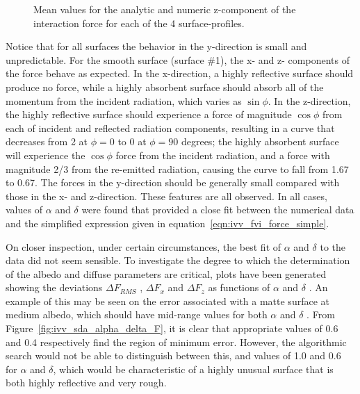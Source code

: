 \begin{description}
\begin{figure}[!ht]
        \caption{Mean values for the analytic and numeric z-component of
                the interaction force for each of the 4
                surface-profiles.}
        \label{fig:ivv_sda_f_vector_diffs_z}
      \end{figure}

      Notice that for all surfaces the behavior in the y-direction
      is small and unpredictable.
      For the smooth surface (surface \#1),
      the x{}- and z{}- components of the force behave
      as expected. In the x{}-direction, a highly reflective surface should
      produce no force, while a highly absorbent surface should absorb all of
      the momentum from the incident radiation, which varies as $\sin \phi$.
      In the z{}-direction, the highly reflective surface should
      experience a force of magnitude  $\cos \phi $ from each of incident and
      reflected radiation components, resulting in a curve that decreases from
      2 at
      $\phi =0$ to 0 at  $\phi =90$ degrees; the highly absorbent surface will
      experience the  $\cos \phi $ force from the incident radiation, and a
      force with magnitude 2/3 from the re{}-emitted radiation, causing the
      curve to fall from 1.67 to 0.67. The forces in the y{}-direction
      should be generally small compared with those in the x{}- and
      z{}-direction. These features are all observed. In all cases,
      values of $\alpha $ and  $\delta $ were found that provided a close fit
      between the numerical data and the simplified expression given in
      equation~\ref{eqn:ivv_fvi_force_simple}.

      \clearpage

      On closer inspection, under certain circumstances, the best fit of
      $\alpha $ and  $\delta $ to the data did not seem sensible. To
      investigate the degree to which the determination of the albedo and
      diffuse parameters are critical, plots have been generated showing the
      deviations  $\Delta F_{\mathit{RMS}}$ , $\Delta F_{x}$ and $\Delta
      F_{z}$ as functions of  $\alpha $ and  $\delta $ . An example of this
      may be seen on the error associated with a matte surface at medium
      albedo, which should have mid{}-range values for both  $\alpha $ and
      $\delta $ . From Figure~\ref{fig:ivv_sda_alpha_delta_F}, it is clear that
      appropriate values of
      0.6 and 0.4 respectively find the region of minimum error. However,
      the algorithmic search would not be able to distinguish between this,
      and values of 1.0 and 0.6 for  $\alpha $ and  $\delta $, which would
      be characteristic of a highly unusual surface that is both highly
      reflective and very rough.


\end{description}
